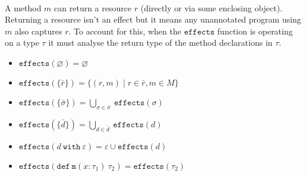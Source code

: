 \documentclass{llncs}
\newcommand{\keywadj}[1]{\mathtt{#1}}
\newcommand{\keyw}[1]{\keywadj{#1}~}
\begin{document}
\paragraph{}
A method $m$ can return a resource $r$ (directly or via some enclosing object). Returning a resource isn't an effect but it means any unannotated program using $m$ also captures $r$. To account for this, when the $\keywadj{effects}$ function is operating on a type $\tau$ it must analyse the return type of the method declarations in $\tau$.

\begin{itemize}
	\item $\keywadj{effects}(\varnothing) = \varnothing$
	\item $\keywadj{effects}(\{\bar r\}) = \{ (r, m) \mid r \in \bar r, m \in M \}$
	\item $\keywadj{effects}(\{\bar \sigma\}) = \bigcup_{\sigma \in \bar \sigma}~\keywadj{effects}(\sigma)$
	\item $\keywadj{effects}(\{\bar d\}) = \bigcup_{d \in \bar d}~\keywadj{effects}(d)$
	\item $\keywadj{effects}(d~\keyw{with} \varepsilon) = \varepsilon \cup \keywadj{effects}(d)$
	\item $\keywadj{effects}(\keywadj{def~m}(x : \tau_1)~\tau_2) = \keywadj{effects}(\tau_2)$

\end{itemize}

\newpage
\end{document}
